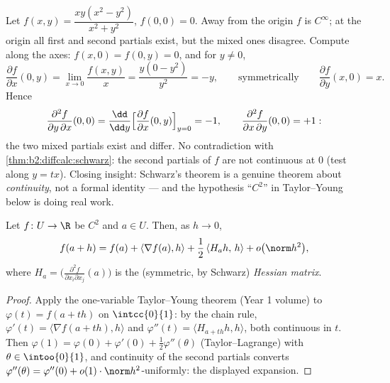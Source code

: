 \begin{example}\label{ex:b2:diffcalc:peano}
Let $f(x, y) = \dfrac{xy(x^2 - y^2)}{x^2 + y^2}$, $f(0,0) = 0$.
Away from the origin $f$ is $C^\infty$; at the origin all first
and second partials exist, but the mixed ones disagree. Compute
along the axes: $f(x, 0) = f(0, y) = 0$, and for $y \neq 0$,
\[
\frac{\partial f}{\partial x}(0, y)
= \lim_{x\to0}\frac{f(x,y)}{x}
= \frac{y(0 - y^2)}{y^2} = -y ,
\qquad\text{symmetrically}\qquad
\frac{\partial f}{\partial y}(x, 0) = x .
\]
Hence
\[
\frac{\partial^2 f}{\partial y\,\partial x}(0,0)
= \frac{\dd}{\dd y}\Bigl[\frac{\partial f}{\partial
x}(0,y)\Bigr]_{y=0} = -1,
\qquad
\frac{\partial^2 f}{\partial x\,\partial y}(0,0) = +1 :
\]
the two mixed partials exist and differ. No contradiction with
\cref{thm:b2:diffcalc:schwarz}: the second partials of $f$ are
not continuous at $0$ (test along $y = tx$). Closing insight:
Schwarz's theorem is a genuine theorem about \emph{continuity},
not a formal identity --- and the hypothesis ``$C^2$'' in
Taylor--Young below is doing real work.
\end{example}

\begin{theorem}\label{thm:b2:diffcalc:taylor}
Let $f \colon U \to \R$ be $C^2$ and $a \in U$. Then, as $h \to 0$,
\[
f(a + h) = f(a) + \langle\nabla f(a), h\rangle
+ \frac12\, \langle H_a h,\, h\rangle + o\bigl(\norm h^2\bigr),
\]
where $H_a = \bigl(\frac{\partial^2 f}{\partial x_i\partial
x_j}(a)\bigr)$ is the (symmetric, by Schwarz) \emph{Hessian
matrix}.
\end{theorem}

\begin{proof}
Apply the one-variable Taylor--Young theorem (Year 1 volume) to
$\varphi(t) = f(a + th)$ on $\intcc{0}{1}$: by the chain rule,
$\varphi'(t) = \langle \nabla f(a + th), h\rangle$ and $\varphi''(t)
= \langle H_{a+th}h, h\rangle$, both continuous in $t$. Then
$\varphi(1) = \varphi(0) + \varphi'(0) + \frac12\varphi''(\theta)$
(Taylor--Lagrange) with $\theta \in \intoo{0}{1}$, and continuity
of the second partials converts $\varphi''(\theta) =
\varphi''(0) + o(1)\cdot\norm h^2$-uniformly: the displayed
expansion.
\end{proof}

